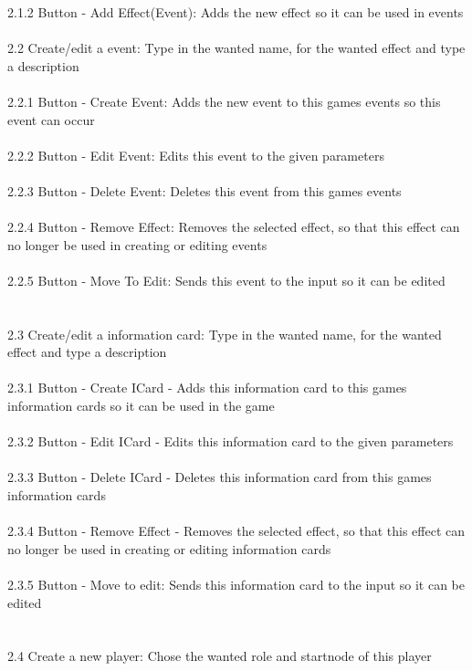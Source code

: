 	2.1.2 Button - Add Effect(Event): Adds the new effect so it can be used in events\\
\\
	2.2 Create/edit a event: Type in the wanted name, for the wanted effect and type a description\\
\\
	2.2.1 Button - Create Event: Adds the new event to this games events so this event can occur\\
\\	
	2.2.2 Button - Edit Event: Edits this event to the given parameters\\
\\	
	2.2.3 Button - Delete Event: Deletes this event from this games events\\
\\	
	2.2.4 Button - Remove Effect: Removes the selected effect, so that this effect can no longer be used in creating or editing events\\
\\	
	2.2.5 Button - Move To Edit: Sends this event to the input so it can be edited\\
\\	
\\	
	2.3 Create/edit a information card: Type in the wanted name, for the wanted effect and type a description\\
\\	
	2.3.1 Button - Create ICard - Adds this information card to this games information cards so it can be used in the game	\\
\\
	2.3.2 Button - Edit ICard - Edits this information card to the given parameters\\
\\
	2.3.3 Button - Delete ICard - Deletes this information card from this games information cards\\
\\
	2.3.4 Button - Remove Effect - Removes the selected effect, so that this effect can no longer be used in creating or editing information cards\\	
\\
	2.3.5 Button - Move to edit: Sends this information card to the input so it can be edited\\
\\	
\\
	2.4 Create a new player: Chose the wanted role and startnode of this player\\
\\

